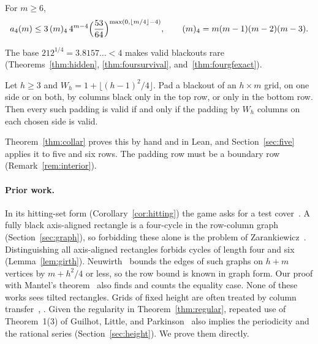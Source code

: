 
For $m\ge6$,
\[
a_4(m)\le3\,(m)_4\,4^{m-4}\Bigl(\frac{53}{64}\Bigr)^{\max(0,\lfloor m/4\rfloor-4)},
\qquad (m)_4=m(m-1)(m-2)(m-3).
\]

The base $212^{1/4}=3.8157\ldots<4$ makes valid blackouts rare (Theorems~\ref{thm:hidden},
\ref{thm:foursurvival}, and~\ref{thm:fourgfexact}).

\begin{introthm}\label{thm:D}
Let $h\ge3$ and $W_h=1+\lfloor(h-1)^2/4\rfloor$. Pad a blackout of an $h\times m$ grid, on
one side or on both, by columns black only in the top row, or only in the bottom row.
Then every such padding is valid if and only if the padding by $W_h$ columns on each
chosen side is valid.
\end{introthm}

Theorem~\ref{thm:collar} proves this by hand and in Lean, and Section~\ref{sec:five} applies it
to five and six rows. The padding row must be a boundary row (Remark~\ref{rem:interior}).

\paragraph{Prior work.} In its hitting-set form (Corollary~\ref{cor:hitting}) the game
asks for a test cover~\cite{katona1966,moretshapiro1985,bellitto2018,foucaud2015}.
A fully black axis-aligned rectangle is a four-cycle in the row-column graph
(Section~\ref{sec:graph}), so forbidding these alone is the problem of
Zarankiewicz~\cite{reiman1958}. Distinguishing all axis-aligned rectangles forbids cycles
of length four and six (Lemma~\ref{lem:girth}).
Neuwirth~\cite[Theorem~1(ii) and Proposition~17]{neuwirth2001} bounds the edges of such
graphs on $h+m$ vertices by $m+h^2/4$ or less, so the row bound is known in graph form.
Our proof with Mantel's theorem~\cite{mantel1907} also finds and counts the equality case.
None of these works sees tilted rectangles. Grids of fixed height are often treated by
column transfer~\cite{euler2005,mertens2024,alanko2011},
\cite[Proposition~V.6]{flajolet2009}. Given the regularity in Theorem~\ref{thm:regular},
repeated use of Theorem~1(3) of Guilhot, Little, and Parkinson~\cite{glp2025} also implies
the periodicity and the rational series (Section~\ref{sec:height}). We prove them directly.

